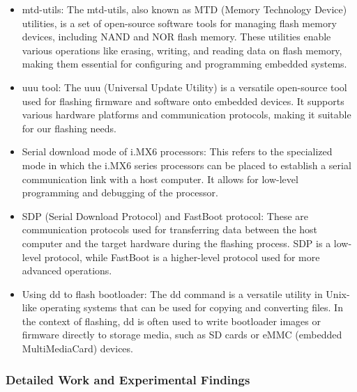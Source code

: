\begin{itemize}
	\item mtd-utils: The mtd-utils, also known as MTD (Memory Technology Device) utilities, is a set of open-source software tools for managing flash memory devices, including NAND and NOR flash memory. These utilities enable various operations like erasing, writing, and reading data on flash memory, making them essential for configuring and programming embedded systems.
	\item uuu tool: The uuu (Universal Update Utility) is a versatile open-source tool used for flashing firmware and software onto embedded devices. It supports various hardware platforms and communication protocols, making it suitable for our flashing needs.
	\item Serial download mode of i.MX6 processors: This refers to the specialized mode in which the i.MX6 series processors can be placed to establish a serial communication link with a host computer. It allows for low-level programming and debugging of the processor.
	\item SDP (Serial Download Protocol) and FastBoot protocol: These are communication protocols used for transferring data between the host computer and the target hardware during the flashing process. SDP is a low-level protocol, while FastBoot is a higher-level protocol used for more advanced operations.
	\item Using dd to flash bootloader: The dd command is a versatile utility in Unix-like operating systems that can be used for copying and converting files. In the context of flashing, dd is often used to write bootloader images or firmware directly to storage media, such as SD cards or eMMC (embedded MultiMediaCard) devices.	
\end{itemize}



\subsubsection*{Detailed Work and Experimental Findings}

